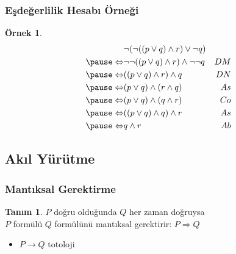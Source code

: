 \documentclass[dvipsnames]{beamer}
\theoremstyle{definition}
\newtheorem{tanim}[theorem]{Tanım}
\theoremstyle{example}
\newtheorem{ornek}[theorem]{Örnek}
\theoremstyle{plain}
\begin{document}
\begin{frame}
  \frametitle{Eşdeğerlilik Hesabı Örneği}

  \begin{ornek}
    \begin{eqnarray*}
                      & \neg (\neg ((p \vee q) \wedge r) \vee \neg q)      &\\
      \pause
      \Leftrightarrow & \neg \neg ((p \vee q) \wedge r) \wedge \neg \neg q & DM\\
      \pause
      \Leftrightarrow & ((p \vee q) \wedge r) \wedge q                     & DN\\
      \pause
      \Leftrightarrow & (p \vee q) \wedge (r \wedge q)                     & As\\
      \pause
      \Leftrightarrow & (p \vee q) \wedge (q \wedge r)                     & Co\\
      \pause
      \Leftrightarrow & ((p \vee q) \wedge q) \wedge r                     & As\\
      \pause
      \Leftrightarrow & q \wedge r                                         & Ab
    \end{eqnarray*}
  \end{ornek}
\end{frame}

\subsection{Akıl Yürütme}

\begin{frame}
  \frametitle{Mantıksal Gerektirme}

  \begin{tanim}
    $P$ doğru olduğunda $Q$ her zaman doğruysa\\
    $P$ formülü $Q$ formülünü \alert{mantıksal gerektirir}: $P \Rightarrow Q$
  \end{tanim}

  \begin{itemize}
    \item $P \rightarrow Q$ totoloji
  \end{itemize}
\end{frame}
\end{document}
